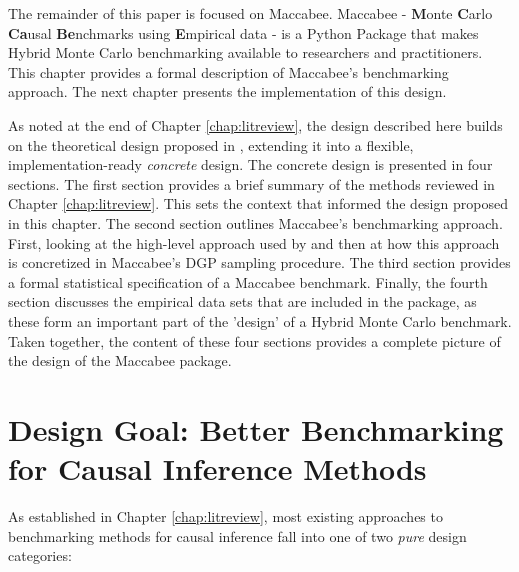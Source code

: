 \documentclass[../main.tex]{subfiles}
\begin{document}
The remainder of this paper is focused on Maccabee. Maccabee - \textbf{M}onte \textbf{C}arlo \textbf{Ca}usal \textbf{Be}nchmarks using \textbf{E}mpirical data - is a Python Package that makes Hybrid Monte Carlo benchmarking available to researchers and practitioners. This chapter provides a formal description of Maccabee's benchmarking approach. The next chapter presents the implementation of this design.

\vspace{\baselineskip}

As noted at the end of Chapter \ref{chap:litreview}, the design described here builds on the theoretical design proposed in \textcite{Dorie2019Automated1}, extending it into a flexible, implementation-ready \textit{concrete} design. The concrete design is presented in four sections. The first section provides a brief summary of the methods reviewed in Chapter \ref{chap:litreview}. This sets the context that informed the design proposed in this chapter. The second section outlines Maccabee's benchmarking approach. First, looking at the high-level approach used by \textcite{Dorie2019Automated1} and then at how this approach is concretized in Maccabee's DGP sampling procedure. The third section provides a formal statistical specification of a Maccabee benchmark. Finally, the fourth section discusses the empirical data sets that are included in the package, as these form an important part of the 'design' of a Hybrid Monte Carlo benchmark. Taken together, the content of these four sections provides a complete picture of the design of the Maccabee package.

\section{Design Goal: Better Benchmarking for Causal Inference Methods}
\label{mac:problems}

As established in Chapter \ref{chap:litreview}, most existing approaches to benchmarking methods for causal inference fall into one of two \textit{pure} design categories:
\end{document}

